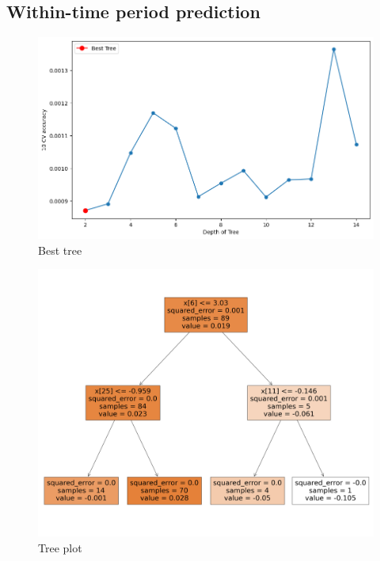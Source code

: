 \documentclass[10pt,leqno]{article}
\begin{document}
\subsection{Within-time period prediction}
\begin{figure}  [h!]
\begin{center}
\caption{Best tree}
\includegraphics[scale=0.4]{BestTree_RF1.png}
\end{center}
\end{figure}  

\begin{figure}  [h!]
\begin{center}
\caption{Tree plot}
\includegraphics[scale=0.2]{TreePlot_RF1.png}
\end{center}
\end{figure}  
\end{document}
